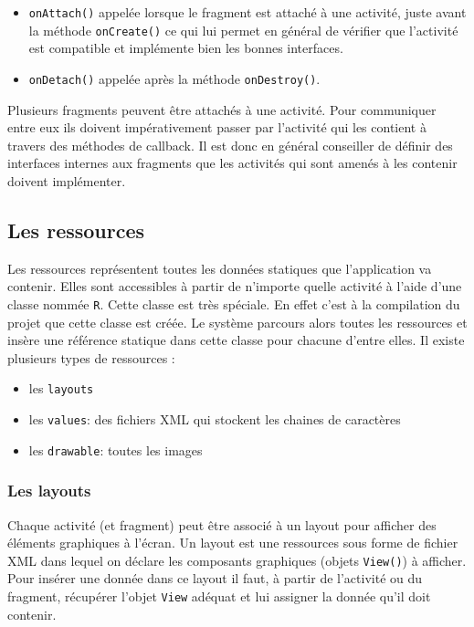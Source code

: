 \begin{itemize}
 	\item \verb!onAttach()! appelée lorsque le fragment est attaché à une activité, juste avant la méthode \verb!onCreate()! ce qui lui permet en général de vérifier que l'activité est compatible et implémente bien les bonnes interfaces.
 	\item \verb!onDetach()! appelée après la méthode \verb!onDestroy()!.
\end{itemize}\bigskip

Plusieurs fragments peuvent être attachés à une activité. Pour communiquer entre eux ils doivent impérativement passer par l'activité qui les contient à travers des méthodes de callback. Il est donc en général conseiller de définir des interfaces internes aux fragments que les activités qui sont amenés à les contenir doivent implémenter. 

\subsection{Les ressources}
Les ressources représentent toutes les données statiques que l'application va contenir. Elles sont accessibles à partir de n'importe quelle activité à l'aide d'une classe nommée \verb!R!. Cette classe est très spéciale. En effet c'est à la compilation du projet que cette classe est créée. Le système parcours alors toutes les ressources et insère une référence statique dans cette classe pour chacune d'entre elles.\bigskip
Il existe plusieurs types de ressources :\bigskip

\begin{itemize}
 	\item les \verb!layouts!
 	\item les \verb!values!: des fichiers XML qui stockent les chaines de caractères
 	\item les \verb!drawable!: toutes les images
\end{itemize}\bigskip

\subsubsection{Les layouts}
Chaque activité (et fragment) peut être associé à un layout pour afficher des éléments graphiques à l'écran. Un layout est une ressources sous forme de fichier XML dans lequel on déclare les composants graphiques (objets \verb!View()!) à afficher. Pour insérer une donnée dans ce layout il faut, à partir de l'activité ou du fragment, récupérer l'objet \verb!View! adéquat et lui assigner la donnée qu'il doit contenir. \bigskip

